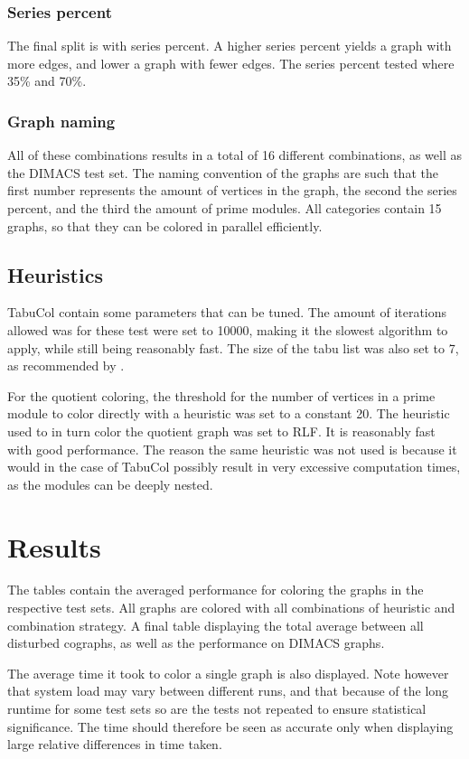 \documentclass[a4paper]{article}
\begin{document}
\subsubsection{Series percent}
The final split is with series percent. A higher series percent yields a graph
with more edges, and lower a graph with fewer  edges. The series percent tested
where 35\% and 70\%.

\subsubsection{Graph naming}
All of these combinations results in a total of 16 different combinations, as well
as the DIMACS test set. The naming convention of the graphs are such that the
first number represents the amount of vertices in the graph, the second the series percent, and the third
the amount of prime modules. All categories contain 15 graphs, so that they can
be colored in parallel efficiently.


\subsection{Heuristics}
TabuCol contain some parameters that can be tuned. The amount of
iterations allowed was for these test were set to 10000, making it the slowest
algorithm to apply, while still being reasonably fast. The size of the tabu list 
was also set to 7, as recommended by \cite{1990}.

For the quotient coloring, the threshold for the number of vertices in a prime
module to color directly with a heuristic was set to a constant 20. The
heuristic used to in turn color the quotient graph was set to RLF. It is
reasonably fast with good performance. The reason the same heuristic was not
used is because it would in the case of TabuCol possibly result in very
excessive computation times, as the modules can be deeply nested.

\section{Results}
\label{sec:Result}
The tables contain the averaged performance for coloring the graphs in the
respective test sets. All graphs are colored with all combinations of heuristic
and combination strategy. A final table displaying the total average between all
disturbed cographs, as well as the performance on DIMACS graphs.

The average time it took to color a single graph is also displayed. Note
however that system load may vary between different runs, and that because of
the long runtime for some test sets so are the tests not repeated to ensure
statistical significance. The time should therefore be seen as accurate only
when displaying large relative differences in time taken.
\end{document}
